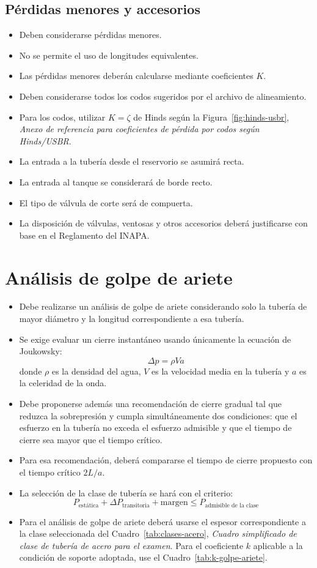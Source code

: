 \documentclass[11pt]{article}
\begin{document}
\subsection{Pérdidas menores y accesorios}
\begin{itemize}
\item Deben considerarse pérdidas menores.
\item No se permite el uso de longitudes equivalentes.
\item Las pérdidas menores deberán calcularse mediante coeficientes $K$.
\item Deben considerarse todos los codos sugeridos por el archivo de alineamiento.
\item Para los codos, utilizar $K=\zeta$ de Hinds según la Figura~\ref{fig:hinds-usbr}, \emph{Anexo de referencia para coeficientes de pérdida por codos según Hinds/USBR}.
\item La entrada a la tubería desde el reservorio se asumirá recta.
\item La entrada al tanque se considerará de borde recto.
\item El tipo de válvula de corte será de compuerta.
\item La disposición de válvulas, ventosas y otros accesorios deberá justificarse con base en el Reglamento del INAPA.
\end{itemize}

\section{Análisis de golpe de ariete}
\begin{itemize}
\item Debe realizarse un análisis de golpe de ariete considerando solo la tubería de mayor diámetro y la longitud correspondiente a esa tubería.
\item Se exige evaluar un cierre instantáneo usando únicamente la ecuación de Joukowsky:
\[
\Delta p = \rho V a
\]
donde $\rho$ es la densidad del agua, $V$ es la velocidad media en la tubería y $a$ es la celeridad de la onda.
\item Debe proponerse además una recomendación de cierre gradual tal que reduzca la sobrepresión y cumpla simultáneamente dos condiciones: que el esfuerzo en la tubería no exceda el esfuerzo admisible y que el tiempo de cierre sea mayor que el tiempo crítico.
\item Para esa recomendación, deberá compararse el tiempo de cierre propuesto con el tiempo crítico $2L/a$.
\item La selección de la clase de tubería se hará con el criterio:
\[
P_{\text{estática}} + \Delta P_{\text{transitoria}} + \text{margen}
\leq P_{\text{admisible de la clase}}
\]
\item Para el análisis de golpe de ariete deberá usarse el espesor correspondiente a la clase seleccionada del Cuadro~\ref{tab:clases-acero}, \emph{Cuadro simplificado de clase de tubería de acero para el examen}. Para el coeficiente $k$ aplicable a la condición de soporte adoptada, use el Cuadro~\ref{tab:k-golpe-ariete}.
\end{itemize}
\end{document}
